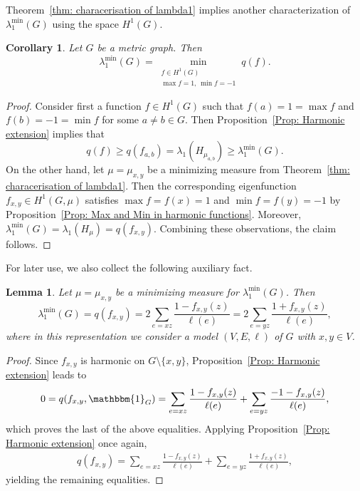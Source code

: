 \documentclass[reqno]{amsart}
\theoremstyle{plain}
\newtheorem{lem}[thm]{Lemma}
\newtheorem{cor}[thm]{Corollary}
\theoremstyle{definition}
\theoremstyle{remark}
\numberwithin{equation}{section}
\newcommand{\one}{\mathbbm{1}}
\begin{document}
Theorem~\ref{thm: characerisation of lambda1} implies another characterization of $\lambda_{1}^{\min}(G)$ using the space $H^1(G)$.
\begin{cor}\label{Cor: Alternative charakterization of lambda 1}
	Let $G$ be a metric graph. Then
	\[
	\lambda_{1}^{\min}(G) = \min_{\substack{f \in H^1(G) \\ \max f =1, \, \min f= -1}}q(f).
	\]
\end{cor}
\begin{proof}
	Consider first a function $f\in H^1(G)$ such that $f(a)=1 = \max f$ and $f(b)=-1=\min f$ for some $a\neq b \in G$. Then Proposition~\ref{Prop: Harmonic extension} implies that
	\[
	q(f) \ge q(f_{a,b}) = \lambda_1 (H_{\mu_{a,b}}) \ge \lambda_{1}^{\min}(G).
	\]
	On the other hand, let $\mu  = \mu_{x,y}$ be a minimizing measure from Theorem~\ref{thm: characerisation of lambda1}. Then the corresponding eigenfunction $f_{x,y} \in H^1(G, \mu)$ satisfies $\max f = f(x) = 1$ and $\min f = f(y) = -1$ by Proposition~\ref{Prop: Max and Min in harmonic functions}. Moreover, $\lambda_{1}^{\min}(G) = \lambda_1(H_\mu) = q(f_{x,y})$. Combining these observations, the claim follows.
\end{proof}

For later use, we also collect the following auxiliary fact.

\begin{lem}\label{lem: energy between two points} Let $\mu = \mu_{x,y}$ be a minimizing measure for $\lambda_{1}^{\min}(G)$. Then
	\[
	\lambda_{1}^{\min}(G)  = q(f_{x,y}) =  2 \sum_{e=xz} \frac{1-f_{x,y}(z)}{\ell(e)}  =  2 \sum_{e=yz} \frac{1+ f_{x,y}(z) }{\ell(e)},
	\]
	where in this representation we consider a model $(V,E, \ell)$ of $G$ with $x,y \in V$.
\end{lem}

\begin{proof} Since $f_{x,y}$ is harmonic on $G\setminus\{x,y\}$, Proposition~\ref{Prop: Harmonic extension} leads to
	\begin{align*}
		0=q(f_{x,y}, \one_G) =  \sum_{e =xz } \frac{1-f_{x,y}(z)}{\ell(e)} + \sum_{e=yz} \frac{-1-f_{x,y}(z)}{\ell(e)} ,
	\end{align*}
	which proves the last of the above equalities. Applying Proposition~\ref{Prop: Harmonic extension} once again,
	\begin{align*}
		q(f_{x,y}) = \sum_{e = xz} \frac{1-f_{x,y}(z)}{\ell(e)} + \sum_{e=yz} \frac{1+f_{x,y}(z)}{\ell(e)},
	\end{align*}
	yielding the remaining equalities.
\end{proof}
\end{document}
